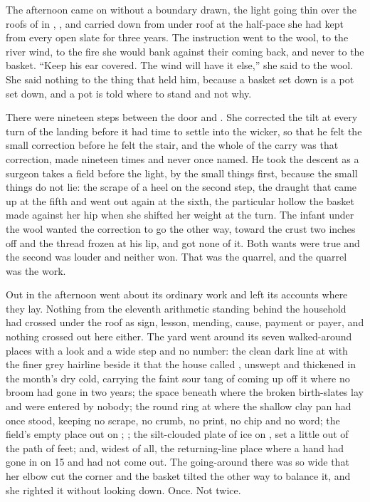 The afternoon came on without a boundary drawn, the light going thin over the roofs of  in , , and  carried  down from under  roof at the half-pace she had kept from every open slate for three years. The instruction went to the wool, to the river wind, to the fire she would bank against their coming back, and never to the basket. “Keep his ear covered. The wind will have it else,” she said to the wool. She said nothing to the thing that held him, because a basket set down is a pot set down, and a pot is told where to stand and not why.

There were nineteen steps between the door and . She corrected the tilt at every turn of the landing before it had time to settle into the wicker, so that he felt the small correction before he felt the stair, and the whole of the carry was that correction, made nineteen times and never once named. He took the descent as a surgeon takes a field before the light, by the small things first, because the small things do not lie: the scrape of a heel on the second step, the draught that came up at the fifth and went out again at the sixth, the particular hollow the basket made against her hip when she shifted her weight at the turn. The infant under the wool wanted the correction to go the other way, toward the crust two inches off and the thread frozen at his lip, and got none of it. Both wants were true and the second was louder and neither won. That was the quarrel, and the quarrel was the work.

Out in  the afternoon went about its ordinary work and left its accounts where they lay. Nothing from the eleventh arithmetic standing behind the household had crossed under the roof as sign, lesson, mending, cause, payment or payer, and nothing crossed out here either. The yard went around its seven walked-around places with a look and a wide step and no number: the clean dark line at  with the finer grey hairline beside it that the house called , unswept and thickened in the month's dry cold, carrying the faint sour tang of  coming up off it where no broom had gone in two years; the space beneath  where the broken birth-slates lay and were entered by nobody; the round ring at  where the shallow clay pan had once stood, keeping no scrape, no crumb, no print, no chip and no word; the field's empty place out on ; ; the silt-clouded plate of ice on , set a little out of the path of feet; and, widest of all, the returning-line place where a hand had gone in on  15 and had not come out. The going-around there was so wide that her elbow cut the corner and the basket tilted the other way to balance it, and she righted it without looking down. Once. Not twice.

